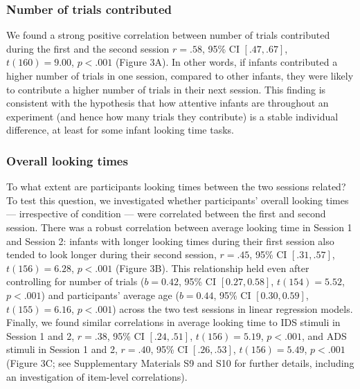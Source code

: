 \documentclass[
  man,floatsintext]{apa6}
\begin{document}
\hypertarget{number-of-trials-contributed}{%
\subsubsection{Number of trials contributed}\label{number-of-trials-contributed}}

We found a strong positive correlation between number of trials contributed during the first and the second session \(r = .58\), 95\% CI \([.47, .67]\), \(t(160) = 9.00\), \(p < .001\) (Figure 3A).
In other words, if infants contributed a higher number of trials in one session, compared to other infants, they were likely to contribute a higher number of trials in their next session.
This finding is consistent with the hypothesis that how attentive infants are throughout an experiment (and hence how many trials they contribute) is a stable individual difference, at least for some infant looking time tasks.

\hypertarget{overall-looking-times}{%
\subsubsection{Overall looking times}\label{overall-looking-times}}

To what extent are participants looking times between the two sessions related?
To test this question, we investigated whether participants' overall looking times --- irrespective of condition --- were correlated between the first and second session.
There was a robust correlation between average looking time in Session 1 and Session 2: infants with longer looking times during their first session also tended to look longer during their second session, \(r = .45\), 95\% CI \([.31, .57]\), \(t(156) = 6.28\), \(p < .001\) (Figure 3B).
This relationship held even after controlling for number of trials (\(b = 0.42\), 95\% CI \([0.27, 0.58]\), \(t(154) = 5.52\), \(p < .001\)) and participants' average age (\(b = 0.44\), 95\% CI \([0.30, 0.59]\), \(t(155) = 6.16\), \(p < .001\)) across the two test sessions in linear regression models.
Finally, we found similar correlations in average looking time to IDS stimuli in Session 1 and 2, \(r = .38\), 95\% CI \([.24, .51]\), \(t(156) = 5.19\), \(p < .001\), and ADS stimuli in Session 1 and 2, \(r = .40\), 95\% CI \([.26, .53]\), \(t(156) = 5.49\), \(p < .001\) (Figure 3C; see Supplementary Materials S9 and S10 for further details, including an investigation of item-level correlations).
\end{document}
